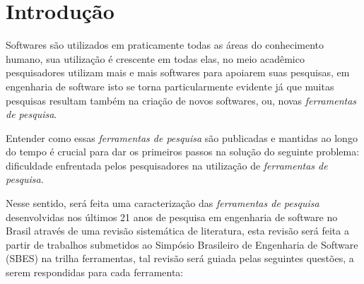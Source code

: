 \documentclass[conference]{IEEEtran}
\begin{document}
\section{Introdução}

Softwares são utilizados em praticamente todas as áreas do conhecimento
humano, sua utilização é crescente em todas elas, no meio acadêmico
pesquisadores utilizam mais e mais softwares para apoiarem suas pesquisas, em
engenharia de software isto se torna particularmente evidente já que
muitas pesquisas resultam também na criação de novos softwares, ou,
novas {\it ferramentas de pesquisa}.

Entender como essas {\it ferramentas de pesquisa} são publicadas e mantidas ao
longo do tempo é crucial para dar os primeiros passos na solução do seguinte
problema: dificuldade enfrentada pelos pesquisadores na utilização de {\it
ferramentas de pesquisa}.

%
%
%

Nesse sentido, será feita uma caracterização das {\it ferramentas de pesquisa}
desenvolvidas nos últimos 21 anos de pesquisa em engenharia de software no
Brasil através de uma revisão sistemática de literatura, esta revisão será
feita a partir de trabalhos submetidos ao Simpósio Brasileiro de Engenharia
de Software (SBES) na trilha ferramentas, tal revisão será guiada pelas
seguintes questões, a serem respondidas para cada ferramenta:
\end{document}
